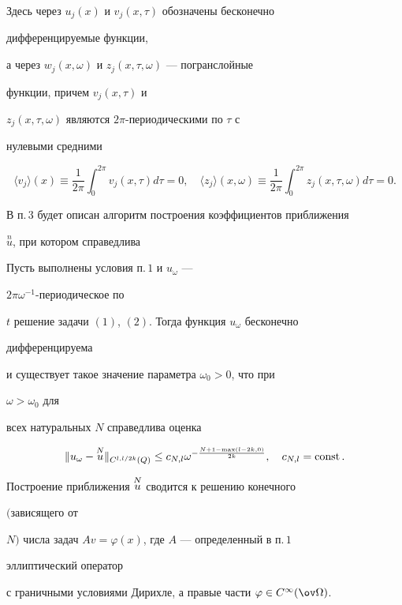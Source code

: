 Здесь через $u_j(x)$ и $v_j(x,\tau)$ обозначены бесконечно 


дифференцируемые функции,  


а через $w_j(x,\omega)$ и $z_j(x,\tau,\omega)$ --- погранслойные 


функции, причем $v_j(x,\tau)$ и  


$z_j(x,\tau,\omega)$ являются $2\pi$-периодическими по $\tau$ с 


нулевыми средними 


$$ 


\langle v_j\rangle(x)\equiv\frac{1}{2\pi}\int^{2\pi}_0 


v_j(x,\tau)d\tau=0,\quad \langle z_j\rangle(x,\omega)\equiv 


\frac{1}{2\pi}\int^{2\pi}_0 z_j(x,\tau,\omega)d\tau=0. 


$$ 





В п.\,3 будет описан алгоритм построения коэффициентов приближения


$\overset{n}{u}$, при котором справедлива


 


\begin{thmnonum} 


Пусть выполнены условия п.\,$1$ и $u_\omega$ --- 


$2\pi\omega^{-1}$-периодическое по  


$t$ решение задачи $(1)$, $(2)$. Тогда функция $u_\omega$ бесконечно 


дифференцируема  


и существует такое значение параметра $\omega_0>0$, что при 


$\omega>\omega_0$ для  


всех натуральных $N$ справедлива оценка 


$$ 


\|u_\omega-\up{N}{u}\|_{C^{l,l/2k}(Q)}\le c_{N,l} 


\omega^{-\frac{N+1-\max(l-2k,0)}{2k}},\quad c_{N,l}=\const. 


$$ 


Построение приближения $\overset{N}{u}{}$ сводится к решению конечного 


$($зависящего от  


$N)$ числа задач $A v=\varphi(x)$, где $A$ --- определенный в п.\,$1$ 


эллиптический оператор 


с граничными условиями Дирихле, а правые части $\varphi\in 


C^\infty(\ov\Omega)$. 


\end{thmnonum} 





